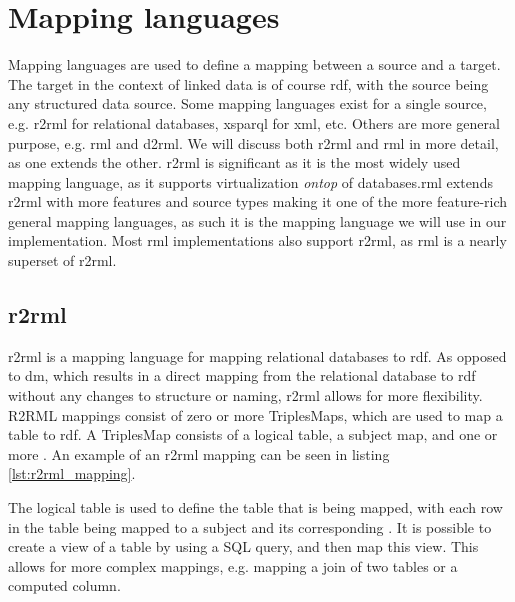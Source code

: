 \section{Mapping languages}
Mapping languages are used to define a mapping between a source and a target. The target in the context of linked data is of course \acrshort{rdf}, with the source being any structured data source. Some mapping languages exist for a single source, e.g. \acrfull{r2rml} for relational databases, \acrfull{xsparql} for \acrshort{xml}, etc. Others are more general purpose, e.g. \acrfull{rml} and \acrfull{d2rml}.
We will discuss both \acrshort{r2rml} and \acrshort{rml} in more detail, as one extends the other. \acrshort{r2rml} is significant as it is the most widely used mapping language, as it supports virtualization \textit{ontop} of databases.\acrshort{rml} extends \acrshort{r2rml} with more features and source types making it one of the more feature-rich general mapping languages, as such it is the mapping language we will use in our implementation.
Most \acrshort{rml} implementations also support \acrshort{r2rml}, as \acrshort{rml} is a nearly superset of \acrshort{r2rml}.

\subsection{\acrshort{r2rml}}
\acrfull{r2rml} is a mapping language for mapping relational databases to \acrshort{rdf}. As opposed to \acrfull{dm}, which results in a direct mapping from the relational database to \acrshort{rdf} without any changes to structure or naming, \acrshort{r2rml} allows for more flexibility. R2RML mappings consist of zero or more TriplesMaps, which are used to map a table to \acrshort{rdf}. A TriplesMap consists of a logical table, a subject map, and one or more . An example of an \acrshort{r2rml} mapping can be seen in listing \ref{lst:r2rml_mapping}.

The logical table is used to define the table that is being mapped, with each row in the table being mapped to a subject and its corresponding . It is possible to create a view of a table by using a SQL query, and then map this view. This allows for more complex mappings, e.g. mapping a join of two tables or a computed column.

